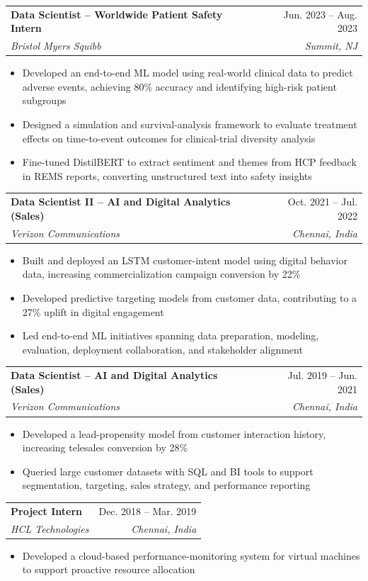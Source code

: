 \documentclass[10pt,letterpaper]{article}
\makeatletter
\newcommand{\job}[4]{%
  \begin{tabularx}{\textwidth}{@{}Xr@{}}
    \textbf{#1} & #2 \\
    \textit{#3} & \textit{#4}
  \end{tabularx}\vspace{-2pt}
}
\makeatother
\begin{document}
\job{Data Scientist -- Worldwide Patient Safety Intern}{Jun. 2023 -- Aug. 2023}{Bristol Myers Squibb}{Summit, NJ}
\begin{itemize}
\item Developed an end-to-end ML model using real-world clinical data to predict adverse events, achieving 80\% accuracy and identifying high-risk patient subgroups
\item Designed a simulation and survival-analysis framework to evaluate treatment effects on time-to-event outcomes for clinical-trial diversity analysis
\item Fine-tuned DistilBERT to extract sentiment and themes from HCP feedback in REMS reports, converting unstructured text into safety insights
\end{itemize}
\vspace{-2pt}

\job{Data Scientist II -- AI and Digital Analytics (Sales)}{Oct. 2021 -- Jul. 2022}{Verizon Communications}{Chennai, India}
\begin{itemize}
\item Built and deployed an LSTM customer-intent model using digital behavior data, increasing commercialization campaign conversion by 22\%
\item Developed predictive targeting models from customer data, contributing to a 27\% uplift in digital engagement
\item Led end-to-end ML initiatives spanning data preparation, modeling, evaluation, deployment collaboration, and stakeholder alignment
\end{itemize}
\vspace{-2pt}

\job{Data Scientist -- AI and Digital Analytics (Sales)}{Jul. 2019 -- Jun. 2021}{Verizon Communications}{Chennai, India}
\begin{itemize}
\item Developed a lead-propensity model from customer interaction history, increasing telesales conversion by 28\%
\item Queried large customer datasets with SQL and BI tools to support segmentation, targeting, sales strategy, and performance reporting
\end{itemize}
\vspace{-2pt}

\job{Project Intern}{Dec. 2018 -- Mar. 2019}{HCL Technologies}{Chennai, India}
\begin{itemize}
\item Developed a cloud-based performance-monitoring system for virtual machines to support proactive resource allocation
\end{itemize}
\vspace{-3pt}
\end{document}
